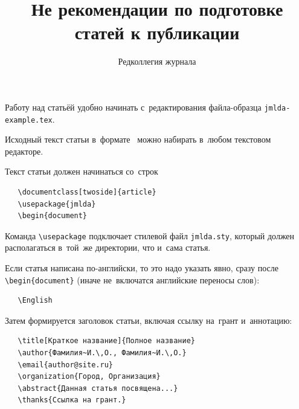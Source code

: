 \documentclass[12pt,twoside]{article}
\begin{document}
\title{Не рекомендации по подготовке статей к публикации}
\author{Редколлегия журнала}

\maketitle
Работу над статьёй удобно начинать с~редактирования
файла-образца \verb'jmlda-example.tex'.

Исходный текст статьи в~формате \LaTeXe\
можно набирать в~любом текстовом редакторе.

Текст статьи должен начинаться со~строк
{\small\begin{verbatim}
   \documentclass[twoside]{article}
   \usepackage{jmlda}
   \begin{document}
\end{verbatim}}

Команда \verb'\usepackage' подключает стилевой файл \verb'jmlda.sty',
который должен располагаться в~той~же директории, что и~сама статья.



Если статья написана по-английски, то это надо указать явно,
сразу после \verb|\begin{document}|
(иначе не~включатся английские переносы слов):
{\small\begin{verbatim}
   \English
\end{verbatim}}

Затем формируется заголовок статьи, включая ссылку на~грант и~аннотацию:
{\small\begin{verbatim}
   \title[Краткое название]{Полное название}
   \author{Фамилия~И.\,О., Фамилия~И.\,О.}
   \email{author@site.ru}
   \organization{Город, Организация}
   \abstract{Данная статья посвящена...}
   \thanks{Ссылка на грант.}
\end{verbatim}}
\end{document}

